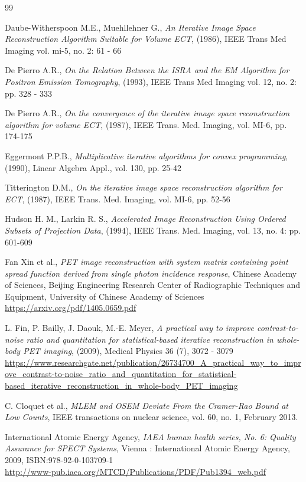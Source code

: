 \documentclass[report,12pt]{report}
\begin{document}
\begin{thebibliography}{99}
	
Daube-Witherspoon M.E., Muehllehner G., \emph{An Iterative Image Space Reconstruction Algorithm Suitable for Volume ECT}, (1986), IEEE Trans Med Imaging vol. mi-5, no. 2: 61 - 66

	
 De Pierro A.R., \emph{On the Relation Between the ISRA and the EM Algorithm for Positron Emission Tomography}, (1993), IEEE Trans Med Imaging vol. 12, no. 2: pp. 328 - 333 


 De Pierro A.R., \emph{On the convergence of the iterative image space reconstruction algorithm for volume ECT}, (1987), IEEE Trans. Med. Imaging, vol. MI-6, pp. 174-175
 
 
  Eggermont P.P.B., \emph{Multiplicative iterative algorithms for convex programming}, (1990), Linear Algebra Appl., vol. 130, pp. 25-42
 
 
 Titterington D.M., \emph{On the iterative image space reconstruction algorithm for ECT}, (1987), IEEE Trans. Med. Imaging, vol. MI-6, pp. 52-56
 
 
  Hudson H. M., Larkin R. S., \emph{Accelerated Image Reconstruction Using Ordered Subsets of Projection Data}, (1994), IEEE Trans. Med. Imaging, vol. 13, no. 4: pp. 601-609
 
 
  Fan Xin et al., \emph{PET image reconstruction with system matrix containing point spread function derived from single photon incidence response}, Chinese Academy of Sciences, Beijing Engineering Research Center of Radiographic Techniques and Equipment, University of Chinese Academy of Sciences
\\ \url{https://arxiv.org/pdf/1405.0659.pdf} 
 
 
 L. Fin, P. Bailly, J. Daouk, M.-E. Meyer, \emph{A practical way to improve contrast-to-noise ratio and quantitation for statistical-based iterative reconstruction in whole-body PET imaging}, (2009), Medical Physics 36 (7), 3072 - 3079
\\ \url{https://www.researchgate.net/publication/26734700_A_practical_way_to_improve_contrast-to-noise_ratio_and_quantitation_for_statistical-based_iterative_reconstruction_in_whole-body_PET_imaging}


 C. Cloquet et al., \emph{MLEM and OSEM Deviate From the Cramer-Rao
Bound at Low Counts}, IEEE transactions on nuclear science, vol. 60, no. 1, February 2013.


 International Atomic Energy Agency, \emph{IAEA human health series, No. 6: Quality Assurance for SPECT Systems}, Vienna : International Atomic Energy Agency, 2009, ISBN:978-92-0-103709-1
	\\ \url{http://www-pub.iaea.org/MTCD/Publications/PDF/Pub1394_web.pdf}
	

\end{thebibliography}
\end{document}
